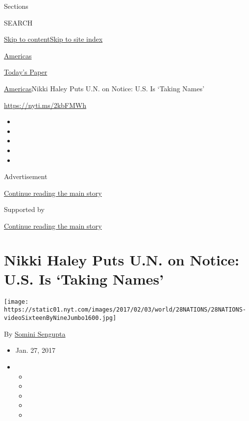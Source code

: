 Sections

SEARCH

\protect\hyperlink{site-content}{Skip to
content}\protect\hyperlink{site-index}{Skip to site index}

\href{https://www.nytimes.com/section/world/americas}{Americas}

\href{https://myaccount.nytimes.com/auth/login?response_type=cookie\&client_id=vi}{}

\href{https://www.nytimes.com/section/todayspaper}{Today's Paper}

\href{/section/world/americas}{Americas}\textbar{}Nikki Haley Puts U.N.
on Notice: U.S. Is `Taking Names'

\url{https://nyti.ms/2kbFMWh}

\begin{itemize}
\item
\item
\item
\item
\item
\end{itemize}

Advertisement

\protect\hyperlink{after-top}{Continue reading the main story}

Supported by

\protect\hyperlink{after-sponsor}{Continue reading the main story}

\hypertarget{nikki-haley-puts-un-on-notice-us-is-taking-names}{%
\section{Nikki Haley Puts U.N. on Notice: U.S. Is `Taking
Names'}\label{nikki-haley-puts-un-on-notice-us-is-taking-names}}

\texttt{[image: https://static01.nyt.com/images/2017/02/03/world/28NATIONS/28NATIONS-videoSixteenByNineJumbo1600.jpg]}

By \href{http://www.nytimes.com/by/somini-sengupta}{Somini Sengupta}

\begin{itemize}
\item
  Jan. 27, 2017
\item
  \begin{itemize}
  \item
  \item
  \item
  \item
  \item
  \end{itemize}
\end{itemize}

